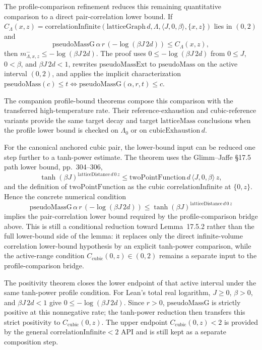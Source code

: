\documentclass[a4paper,11pt]{article}
\begin{document}
The profile-comparison refinement
reduces this remaining quantitative comparison to a direct pair-correlation
lower bound.  If
$C_\Lambda(x,z)=\mathrm{correlationInfinite}(\mathrm{latticeGraph}\,d,\Lambda,
\langle J,0,\beta\rangle,\{x,z\})$ lies in $(0,2)$ and
\[
  \mathrm{pseudoMassG}\,\alpha\,r\,(-\log(\beta J\,2d))
    \le C_\Lambda(x,z),
\]
then $m^-_{\Lambda,x,z}\le -\log(\beta J\,2d)$.  The proof uses
$0\le -\log(\beta J\,2d)$ from $0\le J$, $0<\beta$, and
$\beta J\,2d<1$, rewrites $\mathrm{pseudoMassExt}$ to
$\mathrm{pseudoMass}$ on the active interval $(0,2)$, and applies the
implicit characterization
$\mathrm{pseudoMass}(c)\le t \iff \mathrm{pseudoMassG}(\alpha,r,t)\le c$.

The companion profile-bound theorems compose this comparison with the
transferred high-temperature rate.  Their reference-exhaustion and
cubic-reference variants provide the same target decay and target
$\mathrm{latticeMass}$ conclusions when the profile lower bound is checked on
$\Lambda_0$ or on $\mathrm{cubicExhaustion}\,d$.

For the canonical anchored cubic pair, the lower-bound input can be reduced
one step further to a tanh-power estimate.  The theorem
 uses the
Glimm--Jaffe \S17.5 path lower bound, pp.~304--306,
\[
  \tanh(\beta J)^{\mathrm{latticeDistance}\,d\,0\,z}
    \le \mathrm{twoPointFunction}\,d\,\langle J,0,\beta\rangle\,z,
\]
and the definition of $\mathrm{twoPointFunction}$ as the cubic
$\mathrm{correlationInfinite}$ at $\{0,z\}$.  Hence the concrete numerical
condition
\[
  \mathrm{pseudoMassG}\,\alpha\,r\,(-\log(\beta J\,2d))
    \le \tanh(\beta J)^{\mathrm{latticeDistance}\,d\,0\,z}
\]
implies the pair-correlation lower bound required by the profile-comparison
bridge above.  This is still a conditional reduction toward Lemma~17.5.2
rather than the full lower-bound side of the lemma: it replaces only the direct
infinite-volume correlation lower-bound hypothesis by an explicit tanh-power
comparison, while the active-range condition
$C_{\mathrm{cubic}}(0,z)\in(0,2)$ remains a separate input to the
profile-comparison bridge.

The positivity theorem
closes the lower endpoint of that active interval under the same tanh-power
profile condition.  For Lean's total real logarithm, $J\ge 0$, $\beta>0$, and
$\beta J\,2d<1$ give $0\le -\log(\beta J\,2d)$.  Since $r>0$,
$\mathrm{pseudoMassG}$ is strictly positive at this nonnegative rate; the
tanh-power reduction then transfers this strict positivity to
$C_{\mathrm{cubic}}(0,z)$.  The upper endpoint $C_{\mathrm{cubic}}(0,z)<2$ is
provided by the general $\mathrm{correlationInfinite}<2$ API and is still kept
as a separate composition step.
\end{document}
